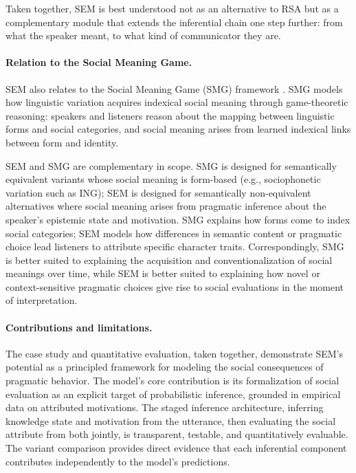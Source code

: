 \documentclass[12pt,a4paper]{article}
\begin{document}
Taken together, SEM is best understood not as an alternative to RSA but as a
complementary module that extends the inferential chain one step further: from
what the speaker meant, to what kind of communicator they are.

\paragraph{Relation to the Social Meaning Game.}
SEM also relates to the Social Meaning Game (SMG) framework
\citep{burnett2017,burnett2019,burnett2023}. SMG models how linguistic variation
acquires indexical social meaning through game-theoretic reasoning: speakers and
listeners reason about the mapping between linguistic forms and social categories,
and social meaning arises from learned indexical links between form and identity.

SEM and SMG are complementary in scope. SMG is designed for semantically
equivalent variants whose social meaning is form-based (e.g., sociophonetic
variation such as ING); SEM is designed for semantically non-equivalent
alternatives where social meaning arises from pragmatic inference about the
speaker's epistemic state and motivation. SMG explains how forms come to index
social categories; SEM models how differences in semantic content or pragmatic
choice lead listeners to attribute specific character traits. Correspondingly, SMG
is better suited to explaining the acquisition and conventionalization of social
meanings over time, while SEM is better suited to explaining how novel or
context-sensitive pragmatic choices give rise to social evaluations in the moment
of interpretation.

\paragraph{Contributions and limitations.}
The case study and quantitative evaluation, taken together, demonstrate SEM's
potential as a principled framework for modeling the social consequences of
pragmatic behavior. The model's core contribution is its formalization of social
evaluation as an explicit target of probabilistic inference, grounded in
empirical data on attributed motivations. The staged inference 
architecture, inferring knowledge state and motivation from
the utterance, then evaluating the social attribute from both jointly, is
transparent, testable, and quantitatively evaluable. The variant
comparison provides direct evidence that each inferential component contributes
independently to the model's predictions.
\end{document}
